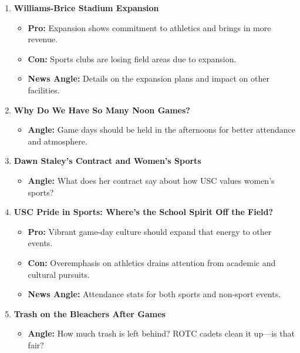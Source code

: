 \documentclass{article}
\begin{document}
\begin{enumerate}[leftmargin=*]
    \item \textbf{Williams-Brice Stadium Expansion}
    \begin{itemize}
        \item \textbf{Pro:} Expansion shows commitment to athletics and brings in more revenue.
        \item \textbf{Con:} Sports clubs are losing field areas due to expansion.
        \item \textbf{News Angle:} Details on the expansion plans and impact on other facilities.
    \end{itemize}

    \item \textbf{Why Do We Have So Many Noon Games?}
    \begin{itemize}
        \item \textbf{Angle:} Game days should be held in the afternoons for better attendance and atmosphere.
    \end{itemize}

    \item \textbf{Dawn Staley's Contract and Women's Sports}
    \begin{itemize}
        \item \textbf{Angle:} What does her contract say about how USC values women's sports?
    \end{itemize}

    \item \textbf{USC Pride in Sports: Where's the School Spirit Off the Field?}
    \begin{itemize}
        \item \textbf{Pro:} Vibrant game-day culture should expand that energy to other events.
        \item \textbf{Con:} Overemphasis on athletics drains attention from academic and cultural pursuits.
        \item \textbf{News Angle:} Attendance stats for both sports and non-sport events.
    \end{itemize}

    \item \textbf{Trash on the Bleachers After Games}
    \begin{itemize}
        \item \textbf{Angle:} How much trash is left behind? ROTC cadets clean it up---is that fair?
    \end{itemize}


\end{enumerate}
\end{document}

